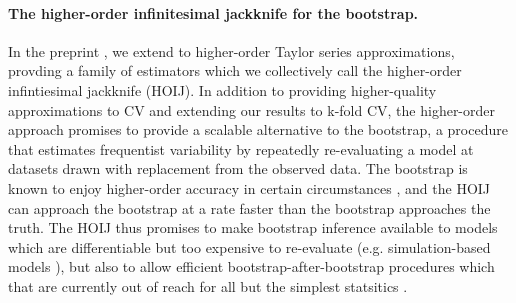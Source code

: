 \paragraph{The higher-order infinitesimal jackknife for the bootstrap.}

In the preprint \citet{giordano2019:hoij}, we extend
\citet{giordano:2019:ij} to higher-order Taylor series approximations,
provding a family of estimators which we collectively call the higher-order
infintiesimal jackknife (HOIJ).  In addition to providing higher-quality
approximations to CV and extending our results to k-fold CV, the higher-order
approach promises to provide a scalable alternative to the bootstrap, a
procedure that estimates frequentist variability by repeatedly re-evaluating a
model at datasets drawn with replacement from the observed data. The bootstrap
is known to enjoy higher-order accuracy in certain circumstances
\citet{hall:2013:bootstrap}, and the HOIJ can approach the bootstrap at a rate
faster than the bootstrap approaches the truth.  The HOIJ thus promises to make
bootstrap inference available to models which are differentiable but too
expensive to re-evaluate (e.g. simulation-based models
\citep{gourieroux:1993:simulation}), but also to allow efficient
bootstrap-after-bootstrap procedures which that are currently out of reach for
all but the simplest statsitics \citep{efron:1994:bootstrap}.

%

